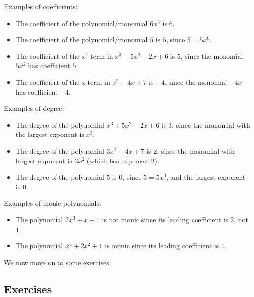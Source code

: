 \documentclass[11pt]{scrartcl}
\begin{document}
\begin{example*}
Examples of coefficients:
\begin{itemize}
\item The coefficient of the polynomial/monomial $6x^3$ is $6$.
\item The coefficient of the polynomial/monomial $5$ is $5$, since $5 = 5x^0$.
\item The coefficient of the $x^2$ term in $x^3+5x^2-2x+6$ is $5$, since the monomial $5x^2$ has coefficient $5$.
\item The coefficient of the $x$ term in $x^2-4x+7$ is $-4$, since the monomial $-4x$ has coefficient $-4$.
\end{itemize}
Examples of degree:
\begin{itemize}
\item The degree of the polynomial $x^3+5x^2-2x+6$ is $3$, since the monomial with the largest exponent is $x^3$.
\item The degree of the polynomial $3x^2-4x+7$ is $2$, since the monomial with largest exponent is $3x^2$ (which has exponent $2$).
\item The degree of the polynomial $5$ is $0$, since $5 = 5x^0$, and the largest exponent is $0$.
\end{itemize}
Examples of monic polynomials:
\begin{itemize}
\item The polynomial $2x^3+x+1$ is not monic since its leading coefficient is $2$, not $1$.
\item The polynomial $x^4+2x^2+1$ is monic since its leading coefficient is $1$.
\end{itemize}
\end{example*}

We now move on to some exercises.

\subsection{Exercises}
\end{document}
